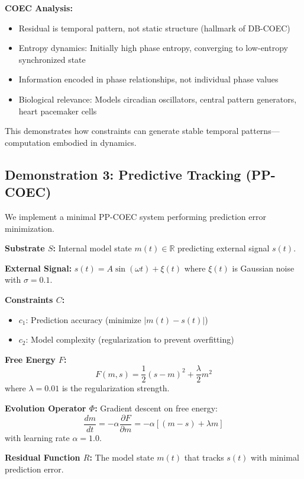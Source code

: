 \documentclass[11pt]{article}
\begin{document}
\textbf{COEC Analysis:}
\begin{itemize}
\item Residual is temporal pattern, not static structure (hallmark of DB-COEC)
\item Entropy dynamics: Initially high phase entropy, converging to low-entropy synchronized state
\item Information encoded in phase relationships, not individual phase values
\item Biological relevance: Models circadian oscillators, central pattern generators, heart pacemaker cells
\end{itemize}

This demonstrates how constraints can generate stable temporal patterns—computation embodied in dynamics.

\subsection{Demonstration 3: Predictive Tracking (PP-COEC)}

We implement a minimal PP-COEC system performing prediction error minimization.

\textbf{Substrate $S$:} Internal model state $m(t) \in \mathbb{R}$ predicting external signal $s(t)$.

\textbf{External Signal:} $s(t) = A\sin(\omega t) + \xi(t)$ where $\xi(t)$ is Gaussian noise with $\sigma = 0.1$.

\textbf{Constraints $C$:}
\begin{itemize}
\item $c_1$: Prediction accuracy (minimize $|m(t) - s(t)|$)
\item $c_2$: Model complexity (regularization to prevent overfitting)
\end{itemize}

\textbf{Free Energy $F$:}
\begin{equation}
F(m, s) = \frac{1}{2}(s - m)^2 + \frac{\lambda}{2}m^2
\end{equation}
where $\lambda = 0.01$ is the regularization strength.

\textbf{Evolution Operator $\Phi$:} Gradient descent on free energy:
\begin{equation}
\frac{dm}{dt} = -\alpha \frac{\partial F}{\partial m} = -\alpha[(m - s) + \lambda m]
\end{equation}
with learning rate $\alpha = 1.0$.

\textbf{Residual Function $R$:} The model state $m(t)$ that tracks $s(t)$ with minimal prediction error.
\end{document}
